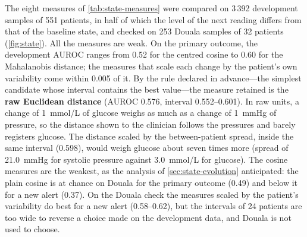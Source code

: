 The eight measures of \cref{tab:state-measures} were compared on 3\,392 development samples of 551 patients, in half of which the level of the next reading differs from that of the baseline state, and checked on 253 Douala samples of 32 patients (\cref{fig:state}). All the measures are weak. On the primary outcome, the development AUROC ranges from 0.52 for the centred cosine to 0.60 for the Mahalanobis distance; the measures that scale each change by the patient's own variability come within 0.005 of it. By the rule declared in advance---the simplest candidate whose interval contains the best value---the measure retained is the \textbf{raw Euclidean distance} (AUROC 0.576, interval 0.552--0.601). In raw units, a change of 1~mmol/L of glucose weighs as much as a change of 1~mmHg of pressure, so the distance shown to the clinician follows the pressures and barely registers glucose. The distance scaled by the between-patient spread, inside the same interval (0.598), would weigh glucose about seven times more (spread of 21.0~mmHg for systolic pressure against 3.0~mmol/L for glucose). The cosine measures are the weakest, as the analysis of \cref{sec:state-evolution} anticipated: the plain cosine is at chance on Douala for the primary outcome (0.49) and below it for a new alert (0.37). On the Douala check the measures scaled by the patient's variability do best for a new alert (0.58--0.62), but the intervals of 24 patients are too wide to reverse a choice made on the development data, and Douala is not used to choose.

